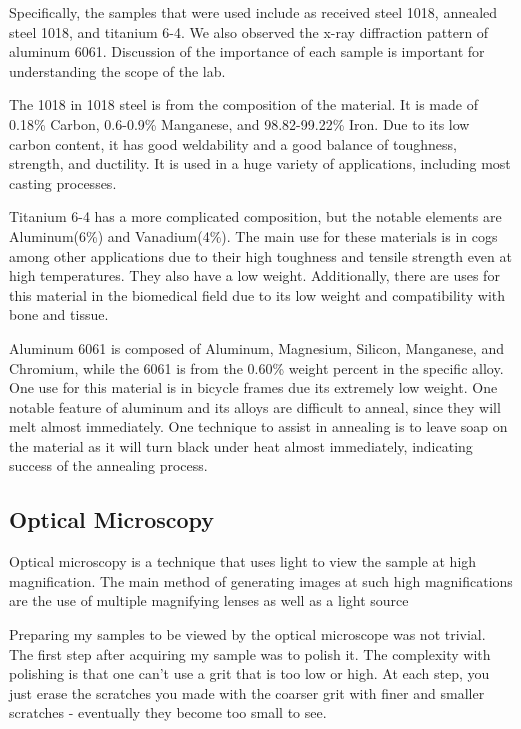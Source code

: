 \documentclass{article}
\begin{document}
Specifically, the samples that were used include as received steel 1018, annealed steel 1018, and titanium 6-4. We also observed the x-ray diffraction pattern of aluminum 6061. Discussion of the importance of each sample is important for understanding the scope of the lab.

The 1018 in 1018 steel is from the composition of the material. It is made of 0.18\% Carbon, 0.6-0.9\% Manganese, and 98.82-99.22\% Iron. Due to its low carbon content, it has good weldability and a good balance of toughness, strength, and ductility. It is used in a huge variety of applications, including most casting processes.

Titanium 6-4 has a more complicated composition, but the notable elements are Aluminum(6\%) and Vanadium(4\%). The main use for these materials is in cogs among other applications due to their high toughness and tensile strength even at high temperatures. They also have a low weight. Additionally, there are uses for this material in the biomedical field due to its low weight and compatibility with bone and tissue.

Aluminum 6061 is composed of Aluminum, Magnesium, Silicon, Manganese, and Chromium, while the 6061 is from the 0.60\% weight percent in the specific alloy. One use for this material is in bicycle frames due its extremely low weight. One notable feature of aluminum and its alloys are difficult to anneal, since they will melt almost immediately. One technique to assist in annealing is to leave soap on the material as it will turn black under heat almost immediately, indicating success of the annealing process.

\subsection{Optical Microscopy}

Optical microscopy is a technique that uses light to view the sample at high magnification. The main method of generating images at such high magnifications are the use of multiple magnifying lenses as well as a light source

Preparing my samples to be viewed by the optical microscope was not trivial. The first step after acquiring my sample was to polish it. The complexity with polishing is that one can't use a grit that is too low or high. At each step, you just erase the scratches you made with the coarser grit with finer and smaller scratches - eventually they become too small to see.
\end{document}
